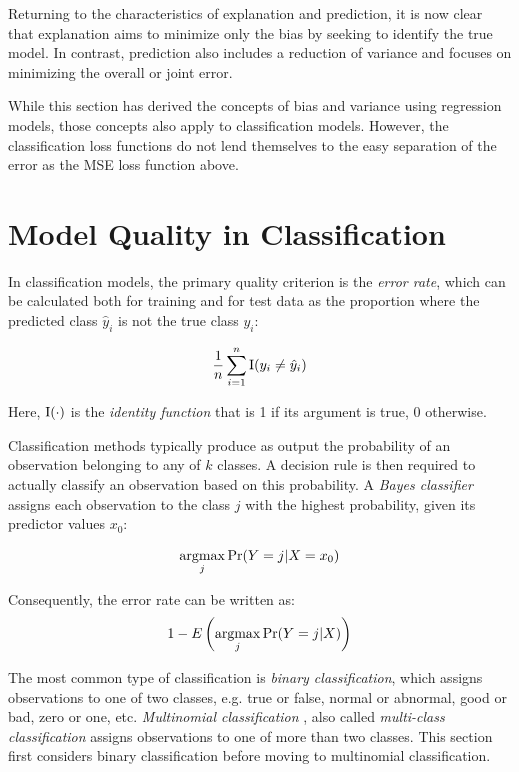 Returning to the characteristics of explanation and prediction, it is now clear that explanation aims to minimize only the bias by seeking to identify the true model. In contrast, prediction also includes a reduction of variance and focuses on minimizing the overall or joint error.

While this section has derived the concepts of bias and variance using regression models, those concepts also apply to classification models. However, the classification loss functions do not lend themselves to the easy separation of the error as the MSE loss function above.

\section{Model Quality in Classification}

In classification models, the primary quality criterion is the \emph{error rate}, which can be calculated both for training and for test data as the proportion where the predicted class $\hat{y}_i$ is not the true class $y_i$:

\begin{align*}
\frac{1}{n}\sum^n_{i=1} \operatorname{I}(y_i \neq \hat{y}_i)
\end{align*}

\noindent Here, $\operatorname{I}(\cdot)$ is the \emph{identity function} that is 1 if its argument is true, 0 otherwise.

Classification methods typically produce as output the probability of an observation belonging to any of $k$ classes. A decision rule is then required to actually classify an observation based on this probability. A \emph{Bayes classifier} assigns each observation to the class $j$ with the highest probability, given its predictor values $x_0$:

\begin{align*}
\operatorname*{argmax}_j \Pr(Y=j| X=x_0)
\end{align*}

\noindent Consequently, the error rate can be written as:
\begin{align*}
1 - E \left( \operatorname*{argmax}_j \Pr (Y=j | X) \right)
\end{align*}

The most common type of classification is \emph{binary classification}, which assigns observations to one of two classes, e.g. true or false, normal or abnormal, good or bad, zero or one, etc. \emph{Multinomial classification} , also called \emph{multi-class classification} assigns observations to one of more than two classes. This section first considers binary classification before moving to multinomial classification.

